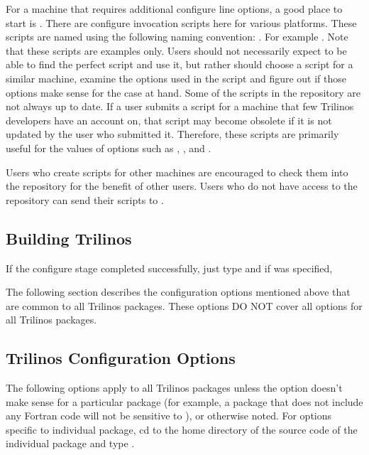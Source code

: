\documentclass[12pt,relax]{TrilinosDevGuide}
\begin{document}
	For a machine that requires additional configure line options, a good 
place to start is .  There are 
configure invocation scripts here for various platforms.  These scripts are 
named using the following naming convention:
.
For example .  Note that these scripts are 
examples only.  Users should not necessarily expect to be able to find the 
perfect script and use it, but rather should choose a script for a similar 
machine, examine the options used in the script and figure out if those 
options make sense for the case at hand.  Some of the scripts in the 
repository are not always up to date.  If a user submits a script for a 
machine that few Trilinos developers have an account on, that script may 
become obsolete if it is not updated by the user who submitted it.  Therefore, 
these scripts are primarily useful for the values of options such as 
, , 
and .  

Users who create scripts for other machines are encouraged to check them into 
the repository for the benefit of other users.  Users who do not have access to
the repository can send their scripts to .

\subsection{Building Trilinos}

If the configure stage completed successfully, just type 
 and if 
 was specified, 

The following section describes the configuration options mentioned above that 
are common to all Trilinos packages.  These options DO NOT cover all options 
for all Trilinos packages.

\subsection{Trilinos Configuration Options}
\label{subsect:TrilinosConfigOptions}
The following options apply to all Trilinos packages unless 
the option doesn't make sense for a particular package (for example, a 
package that does not include any Fortran code will not be sensitive to 
), or otherwise noted.  For options specific to 
individual package, cd to the home directory of the source code of the 
individual package and type .
\end{document}
